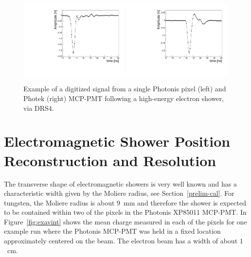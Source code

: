 \begin{figure}[h]
  \centering
  \includegraphics[width=0.49\textwidth]{Images/expulse/pulsepix_30_2_12.pdf}
  \includegraphics[width=0.49\textwidth]{Images/expulse/pulseref_30_2_10.pdf}
  \caption{\small Example of a digitized signal from a single Photonis pixel
(left) and Photek (right) MCP-PMT following a high-energy electron shower, via DRS4.}
  \label{fig:expulse}
\end{figure}


\section{ Electromagnetic Shower Position Reconstruction and Resolution}\label{sec:position}
The transverse shape of electromagnetic showers is very
well known and has a characteristic width given by the Moliere radius,
see Section~\ref{prelim-cal}. For
tungsten, the Moliere radius is about $9$~mm and therefore the shower
is expected to be contained within two of the pixels in the Photonis XP85011 MCP-PMT. In
Figure~\ref{fig:exavint} shows the mean charge measured in each of the pixels
for one example run where the Photonis MCP-PMT was held in a fixed location
approximately centered on the beam. The electron beam has a width of about
$1$~cm. 

